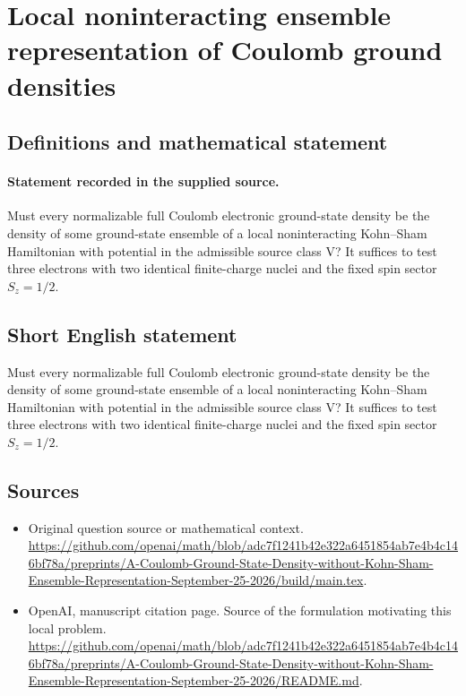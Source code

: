 \documentclass[11pt]{article}
\begin{document}
\section*{Local noninteracting ensemble representation of Coulomb ground densities}\label{statement}
\subsection{Definitions and mathematical statement}
\paragraph{Statement recorded in the supplied source.}
Must every normalizable full Coulomb electronic ground-state density be the density of some ground-state ensemble of a local noninteracting Kohn–Sham Hamiltonian with potential in the admissible source class V? It suffices to test three electrons with two identical finite-charge nuclei and the fixed spin sector $S_z=1/2$.
\subsection{Short English statement}
Must every normalizable full Coulomb electronic ground-state density be the density of some ground-state ensemble of a local noninteracting Kohn–Sham Hamiltonian with potential in the admissible source class V? It suffices to test three electrons with two identical finite-charge nuclei and the fixed spin sector $S_z=1/2$.
\subsection{Sources}
\begin{itemize}
\item[S1] Original question source or mathematical context.
\url{https://github.com/openai/math/blob/adc7f1241b42e322a6451854ab7e4b4c146bf78a/preprints/A-Coulomb-Ground-State-Density-without-Kohn-Sham-Ensemble-Representation-September-25-2026/build/main.tex}.
\item[S2] OpenAI, manuscript citation page. Source of the formulation motivating this local problem.
\url{https://github.com/openai/math/blob/adc7f1241b42e322a6451854ab7e4b4c146bf78a/preprints/A-Coulomb-Ground-State-Density-without-Kohn-Sham-Ensemble-Representation-September-25-2026/README.md}.
\end{itemize}
\end{document}
